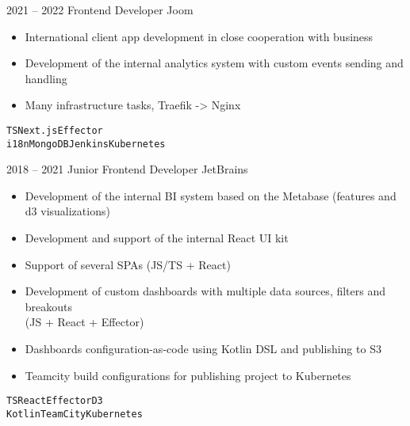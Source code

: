 \documentclass[9pt]{template}
\begin{document}
\begin{entrylist}
	\entry
	{2021 -- 2022}
	{Frontend Developer}
	{Joom}
	{
	        \begin{itemize}[noitemsep,topsep=5pt,leftmargin=8pt]
		        \item International client app development in close cooperation with business
		        \item Development of the internal analytics system with custom events sending and handling
		        \item Many infrastructure tasks, Traefik -> Nginx
		\end{itemize}
		\texttt{TS}\slashsep\texttt{Next.js}\slashsep\texttt{Effector}\\
		\texttt{i18n}\slashsep\texttt{MongoDB}\slashsep\texttt{Jenkins}\slashsep\texttt{Kubernetes}}
	\entry
	{2018 -- 2021}
	{Junior Frontend Developer}
	{JetBrains}
	{
	        \begin{itemize}[noitemsep,topsep=5pt,leftmargin=8pt]
		        \item Development of the internal BI system based on the Metabase (features and d3 visualizations)
		        \item Development and support of the internal React UI kit
		        \item Support of several SPAs (JS/TS + React)
		        \item Development of custom dashboards with multiple data sources, filters and breakouts\\ (JS + React + Effector)\\ 
		        \item Dashboards configuration-as-code using Kotlin DSL and publishing to S3
		        \item Teamcity build configurations for publishing project to Kubernetes
		\end{itemize}
		\texttt{TS}\slashsep\texttt{React}\slashsep\texttt{Effector}\slashsep\texttt{D3}\\
		\texttt{Kotlin}\slashsep\texttt{TeamCity}\slashsep\texttt{Kubernetes}}
\end{entrylist}

\end{document}
